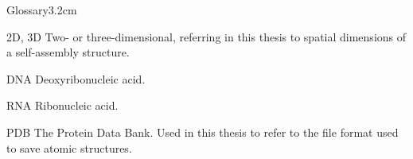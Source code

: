 \begin{mclistof}{Glossary}{3.2cm}

\item[2D, 3D] Two- or three-dimensional, referring in this thesis to spatial dimensions of a self-assembly structure.

\item[DNA] Deoxyribonucleic acid.

\item[RNA] Ribonucleic acid.

\item[PDB] The Protein Data Bank. Used in this thesis to refer to the file format used to save atomic structures.

\end{mclistof} 
